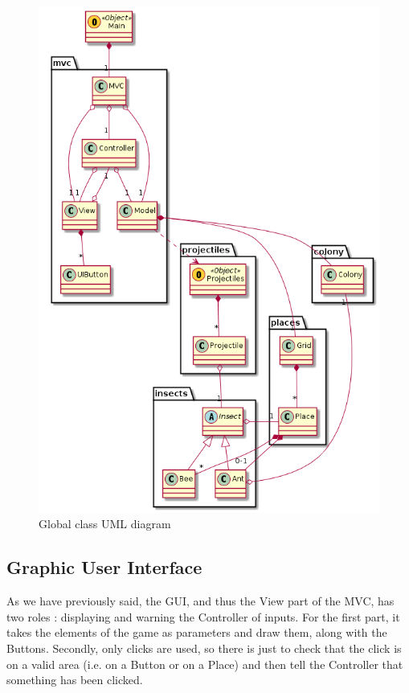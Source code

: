 \documentclass[
	a4paper
]{article}
\begin{document}
%
\begin{figure}[H]
	\includegraphics[scale=0.65]{classDiagram.png}
	\caption{Global class UML diagram}
	\label{classDiagram}
\end{figure}
%

	\subsection{Graphic User Interface}
	
	As we have previously said, the GUI, and thus the View part of the MVC, has two roles : %
displaying and warning the Controller of inputs. For the first part, it takes the elements of the game as parameters and draw them, along with the Buttons. %
Secondly, only clicks are used, so there is just to check that the click is on a valid area (i.e. on a Button or on a Place) and then tell the Controller that something has been clicked.
	
\end{document}
